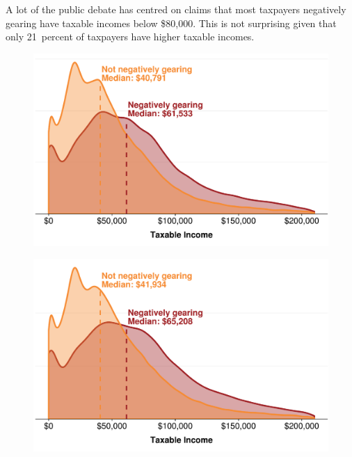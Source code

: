 \documentclass{grattan}\usepackage[]{graphicx}\usepackage[]{color}
\begin{document}
A lot of the public debate has centred on claims that most taxpayers negatively gearing have taxable incomes below \$80,000. This is not surprising given that only 21~percent of taxpayers have higher taxable incomes. 

\begin{figure}


\includegraphics[width=\columnwidth]{CGT-NG-atlas//tx-inc-distr-by-NG-1}
\end{figure}

\begin{figure}

\includegraphics[width=\columnwidth]{CGT-NG-atlas//tx-inc-distr-by-NG-latest-1}
\end{figure}
\end{document}
